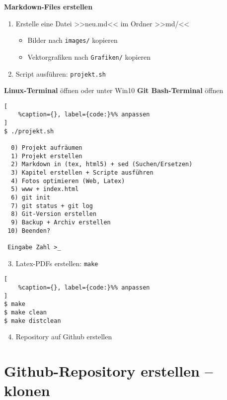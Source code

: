 \textbf{Markdown-Files erstellen}

\begin{enumerate}
\item
  Erstelle eine Datei >>neu.md<< im Ordner >>md/<<

  \begin{itemize}
  \item
    Bilder nach \verb|images/| kopieren
  \item
    Vektorgrafiken nach \verb|Grafiken/| kopieren
  \end{itemize}
\item
  Script ausführen: \verb|projekt.sh|
\end{enumerate}

\textbf{Linux-Terminal} öffnen oder unter Win10 \textbf{Git
Bash-Terminal} öffnen

\lstset{language=C}%
\begin{lstlisting}[
	%caption={}, label={code:}%% anpassen
]
$ ./projekt.sh

  0) Projekt aufräumen
  1) Projekt erstellen
  2) Markdown in (tex, html5) + sed (Suchen/Ersetzen)
  3) Kapitel erstellen + Scripte ausführen
  4) Fotos optimieren (Web, Latex)
  5) www + index.html
  6) git init
  7) git status + git log
  8) Git-Version erstellen
  9) Backup + Archiv erstellen
 10) Beenden?

 Eingabe Zahl >_
\end{lstlisting}

\begin{enumerate}
\setcounter{enumi}{2}
\item
  Latex-PDFs erstellen: \verb|make|
\end{enumerate}

\lstset{language=C}%
\begin{lstlisting}[
	%caption={}, label={code:}%% anpassen
]
$ make
$ make clean
$ make distclean
\end{lstlisting}

\begin{enumerate}
\setcounter{enumi}{3}
\item
  Repository auf Github erstellen
\end{enumerate}

\section{Github-Repository erstellen --
klonen}\label{github-repository-erstellen-klonen}

